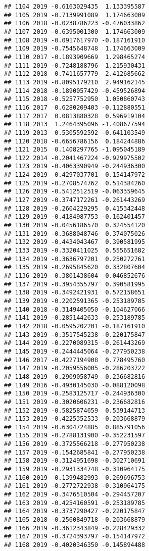 \documentclass[
]{article}
\begin{document}
\begin{verbatim}
## 1104 2019 -0.6163029435  1.133395587
## 1105 2019 -0.7139991089  1.174663009
## 1106 2018 -0.0238786223 -0.476033862
## 1107 2019 -0.6395001300  1.174663009
## 1108 2019 -0.0917617970 -0.187161910
## 1109 2019 -0.7545648748  1.174663009
## 1110 2017 -0.1893909669  1.298465274
## 1111 2019 -0.7248188796  1.215930431
## 1112 2018 -0.7411657779  2.412685662
## 1113 2019 -0.8095179210  2.949162145
## 1114 2018 -0.1890057429 -0.459526894
## 1115 2018 -0.5257752950  1.050860743
## 1116 2017  0.6280209403 -0.112880551
## 1117 2017  0.0813880328  0.596919104
## 1118 2013  1.2464395096 -1.408677594
## 1119 2013  0.5305592592 -0.641103549
## 1120 2018 -0.6656786156  0.184244886
## 1121 2015  0.1408297765 -1.095045189
## 1122 2014 -0.2041467224 -0.929975502
## 1123 2019 -0.4063390949 -0.244936300
## 1124 2019 -0.4297037701 -0.154147972
## 1125 2019 -0.2708574762  0.514384260
## 1126 2019 -0.5412512519 -0.063359645
## 1127 2019 -0.3747172261 -0.261443269
## 1128 2019 -0.2604229295  0.415342448
## 1129 2019 -0.4184987753 -0.162401457
## 1130 2019 -0.0456186570  0.324554120
## 1131 2019 -0.3688048746  0.374075026
## 1132 2019 -0.4434043467  0.390581995
## 1133 2019 -0.3320411025  0.555651682
## 1134 2019 -0.3636797201  0.250272761
## 1135 2019 -0.2695845620  0.332807604
## 1136 2019 -0.3801438604 -0.046852676
## 1137 2019 -0.3954355797  0.390581995
## 1138 2019 -0.3492421931  0.572158651
## 1139 2019 -0.2202591365 -0.253189785
## 1140 2018 -0.3149405050 -0.104627066
## 1141 2019 -0.2851442633 -0.253189785
## 1142 2018 -0.0595202201 -0.187161910
## 1143 2019 -0.3517545238 -0.220175847
## 1144 2019 -0.2270089315 -0.261443269
## 1145 2019 -0.2444445064 -0.277950238
## 1146 2017 -0.4227194908  0.778495760
## 1147 2019 -0.2059556005 -0.286203722
## 1148 2019 -0.2909058749 -0.236682816
## 1149 2016 -0.4930145030 -0.088120098
## 1150 2019 -0.2583125717 -0.244936300
## 1151 2019 -0.3020606231 -0.236682816
## 1152 2019 -0.5825874659  0.539144713
## 1153 2019 -0.4225352533 -0.203668879
## 1154 2019 -0.6304724885  0.885791056
## 1155 2019 -0.2788131900 -0.352231597
## 1156 2019 -0.3725566218 -0.277950238
## 1157 2019 -0.1542685841 -0.277950238
## 1158 2019 -0.3124951698 -0.302710691
## 1159 2019 -0.2931334748 -0.310964175
## 1160 2019 -0.1399482993 -0.269696753
## 1161 2019 -0.2772722938 -0.310964175
## 1162 2019 -0.3476510504 -0.294457207
## 1163 2019 -0.4254160591 -0.253189785
## 1164 2019 -0.3737290427 -0.220175847
## 1165 2018 -0.2560849718 -0.203668879
## 1166 2019 -0.3612343849 -0.228429332
## 1167 2019 -0.3724393797 -0.154147972
## 1168 2019 -0.4020346350 -0.145894488

\end{verbatim}
\end{document}
